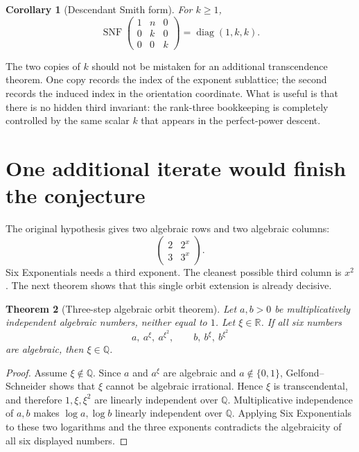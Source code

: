 \documentclass[11pt]{article}
\numberwithin{equation}{section}
\newtheorem{theorem}{Theorem}[section]
\newtheorem{corollary}[theorem]{Corollary}
\theoremstyle{definition}
\newcommand{\Q}{\mathbb{Q}}
\newcommand{\R}{\mathbb{R}}
\newcommand{\SNF}{\operatorname{SNF}}
\begin{document}
\begin{corollary}[Descendant Smith form]\label{cor:descSNF}
For \(k\ge1\),
\[
 \SNF\!\begin{pmatrix}
       1&n&0\\
       0&k&0\\
       0&0&k
 \end{pmatrix}
 =\operatorname{diag}(1,k,k).
\]
\end{corollary}

The two copies of \(k\) should not be mistaken for an additional transcendence theorem. One copy records the index of the exponent sublattice; the second records the induced index in the orientation coordinate. What is useful is that there is no hidden third invariant: the rank-three bookkeeping is completely controlled by the same scalar \(k\) that appears in the perfect-power descent.

\section{One additional iterate would finish the conjecture}

The original hypothesis gives two algebraic rows and two algebraic columns:
\[
 \begin{pmatrix}
  2&2^x\\
  3&3^x
 \end{pmatrix}.
\]
Six Exponentials needs a third exponent. The cleanest possible third column is \(x^2\). The next theorem shows that this single orbit extension is already decisive.

\begin{theorem}[Three-step algebraic orbit theorem]\label{thm:threeorbit}
Let \(a,b>0\) be multiplicatively independent algebraic numbers, neither equal to \(1\). Let \(\xi\in\R\). If all six numbers
\[
       a,\ a^\xi,\ a^{\xi^2},
       \qquad
       b,\ b^\xi,\ b^{\xi^2}
\]
are algebraic, then \(\xi\in\Q\).
\end{theorem}

\begin{proof}
Assume \(\xi\notin\Q\). Since \(a\) and \(a^\xi\) are algebraic and \(a\notin\{0,1\}\), Gelfond--Schneider shows that \(\xi\) cannot be algebraic irrational. Hence \(\xi\) is transcendental, and therefore \(1,\xi,\xi^2\) are linearly independent over \(\Q\). Multiplicative independence of \(a,b\) makes \(\log a,\log b\) linearly independent over \(\Q\). Applying Six Exponentials to these two logarithms and the three exponents contradicts the algebraicity of all six displayed numbers.
\end{proof}
\end{document}
